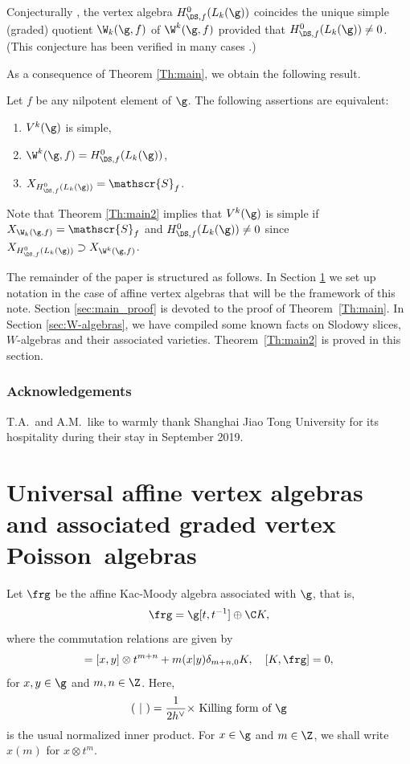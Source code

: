 Conjecturally \cite{KacRoaWak03,KacWak08},
the vertex algebra
$H^{0}_{\DS,f}(L_k(\g))$ coincides
the unique simple (graded) quotient $\W_k(\g,f)$
of $\W^k(\g,f)$
provided that
\hbox{$H^{0}_{\DS,f}(L_k(\g))\ne 0$.}
(This conjecture has been verified in many cases \cite{Ara05,Ara07,Ara08-a,AEkeren19}.)

As a consequence of Theorem \ref{Th:main}, we obtain the following
result.

\begin{theorem}\label{Th:main2}
Let $f$ be any nilpotent element of $\g$.
The following assertions are equivalent:
\begin{enumerate}
\item\label{Th:main21} $V^k(\g)$ is simple,
\item\label{Th:main22} $\W^k(\g,f)=H^{0}_{\DS,f}(L_k(\g))$,
\item\label{Th:main23} $X_{H^{0}_{\DS,f}(L_k(\g))} = \mathscr{S}_f$.
\end{enumerate}
\end{theorem}

Note that Theorem \ref{Th:main2} implies that
$V^k(\g)$ is simple
if
$X_{\W_k(\g,f)}=\mathscr{S}_f$
and $H^{0}_{\DS,f}(L_k(\g))\ne 0$
since
$ X_{H_{\DS,f}^0(L_k(\g))}\supset X_{\W^k(\g,f)}$.

The remainder of the paper is structured as follows.
In Section \ref{sec:affine_vertex_algebras} we set up notation
in the case of affine vertex algebras that will be the framework of this note.
Section \ref{sec:main_proof} is devoted to the proof of Theorem~\ref{Th:main}.
In Section \ref{sec:W-algebras}, we have compiled some known facts
on Slodowy slices, $W$-algebras and their associated varieties.
Theorem~\ref{Th:main2} is proved in this section.

\subsubsection*{Acknowledgements}
T.A.~and A.M.~like to warmly thank Shanghai Jiao Tong University
for its hospitality during their stay in September 2019.

\section{Universal affine vertex algebras and associated
graded vertex \texorpdfstring{Poisson~algebras}{Poisson algebras}}
\label{sec:affine_vertex_algebras}
Let
$\frg$ be the affine Kac-Moody algebra associated with $\g$, that is,
\begin{equation*}
\frg =\g [t,t^{-1}]\oplus \C K,
\end{equation*}
where the commutation relations are given by
\begin{equation*}
[x\otimes t^m,y\otimes t^n]=[x,y]\otimes t^{m+n}+m(x|y)\delta_{m+n,0}K,\quad
[K,\frg]=0,
\end{equation*}
for $x,y\in \g$ and $m,n\in \Z$.
Here,
\[
(~|~)=\displaystyle{\frac{1}{2h^\vee}\times} \text{ Killing form of }\g
\]
is the usual normalized inner product.
For $x \in \g$ and $m \in \Z$, we shall write $x(m)$ for $x
\otimes t^m$.


